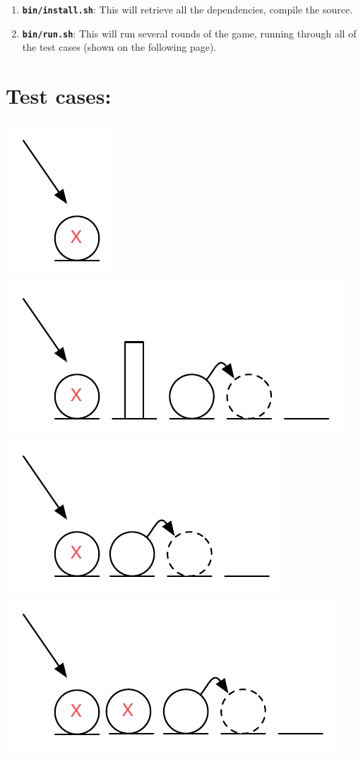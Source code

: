\begin{enumerate}[1.]
\item
  \textbf{\texttt{bin/install.sh}}: This will retrieve all the
  dependencies, compile the source.
\item
  \textbf{\texttt{bin/run.sh}}: This will run several rounds of the
  game, running through all of the test cases (shown on the following
  page).
\end{enumerate}

\pagebreak

\section{Test cases:}

\includegraphics{figs/test1.pdf} \includegraphics{figs/test2.pdf}
\includegraphics{figs/test3.pdf} \includegraphics{figs/test4.pdf}
